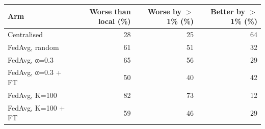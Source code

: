 \begin{tabular}{lrrr}
\toprule
Arm & Worse than local (\%) & Worse by $>$1\% (\%) & Better by $>$1\% (\%) \\
\midrule
Centralised & 28 & 25 & 64 \\
FedAvg, random & 61 & 51 & 32 \\
FedAvg, α=0.3 & 65 & 56 & 29 \\
FedAvg, α=0.3 + FT & 50 & 40 & 42 \\
FedAvg, K=100 & 82 & 73 & 12 \\
FedAvg, K=100 + FT & 59 & 46 & 29 \\
\bottomrule
\end{tabular}
